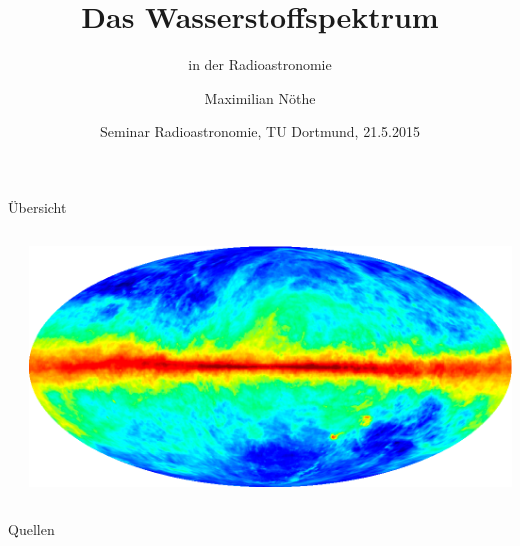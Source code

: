 \documentclass[compress, aspectratio=169]{beamer}
\author{Maximilian Nöthe}
\date[21.5.2015]{Seminar Radioastronomie, TU Dortmund, 21.5.2015}
\title{Das Wasserstoffspektrum}
\subtitle{in der Radioastronomie}
\begin{document}
\maketitle

\begin{frame}{Übersicht}
  \begin{columns}[c, onlytextwidth]
    \begin{column}{0.47\textwidth}
      \linespread{1.5}
      \tableofcontents
    \end{column}
    \begin{column}{0.47\textwidth}
      \includegraphics[width=\linewidth]{./images/lrg_lab_fullvel.png}
    \end{column}
  \end{columns}
\end{frame}







\begin{frame}{Quellen}
\printbibliography{}
\end{frame}
\end{document}
